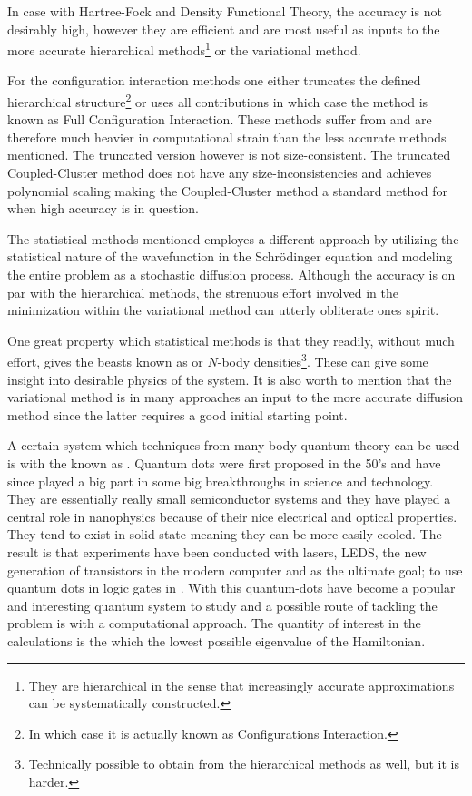     In case with Hartree-Fock and Density Functional Theory, the accuracy is
    not desirably high, however they are efficient and are most useful as
    inputs to the more accurate hierarchical methods\footnote{They are
    hierarchical in the sense that increasingly accurate approximations can be
    systematically constructed.} or the variational method.

    For the configuration interaction methods one either truncates the defined
    hierarchical structure\footnote{In which case it is actually known as
    Configurations Interaction.} or uses all contributions in which case the
    method is known as Full Configuration Interaction. These methods suffer
    from  and are therefore much heavier in
    computational strain than the less accurate methods mentioned. The
    truncated version however is not size-consistent.  The truncated
    Coupled-Cluster method does not have any size-inconsistencies and achieves
    polynomial scaling making the Coupled-Cluster method a standard method for
    when high accuracy is in question. 

    The statistical methods mentioned employes a different approach by
    utilizing the statistical nature of the wavefunction in the Schrödinger
    equation and modeling the entire problem as a stochastic diffusion process.
    Although the accuracy is on par with the hierarchical methods, the
    strenuous effort involved in the minimization within the variational method
    can utterly obliterate ones spirit.

    One great property which statistical methods is that they readily, without
    much effort, gives the beasts known as  or $N$-body
    densities\footnote{Technically possible to obtain from the hierarchical
    methods as well, but it is harder.}. These can give some insight into
    desirable physics of the system. It is also worth to mention that the
    variational method is in many approaches an input to the more accurate
    diffusion method since the latter requires a good initial starting point.

    A certain system which techniques from many-body quantum theory can be used
    is with the  known as .
    Quantum dots were first proposed in the 50's and have since played a
    big part in some big breakthroughs in science and technology. They are
    essentially really small semiconductor systems and they have played a
    central role in nanophysics because of their nice electrical and optical
    properties. They tend to exist in solid state meaning they can be more
    easily cooled. The result is that experiments have been conducted with
    lasers, LEDS, the new generation of transistors in the modern computer and
    as the ultimate goal; to use quantum dots in logic gates in . With this quantum-dots have become a popular and interesting
    quantum system to study and a possible route of tackling the problem is
    with a computational approach. The quantity of interest in the calculations
    is the  which the lowest possible eigenvalue of
    the Hamiltonian.

